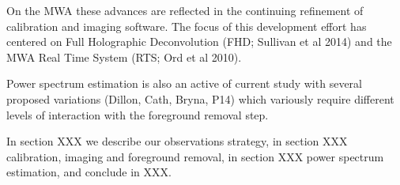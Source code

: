 On the MWA these advances are reflected in the continuing refinement of calibration and imaging software. The focus of this development effort has centered on Full Holographic Deconvolution (FHD; Sullivan et al 2014) and the MWA Real Time System (RTS; Ord et al 2010).  


Power spectrum estimation is also an active of current study with several proposed variations (Dillon, Cath, Bryna, P14) which variously require different levels of interaction with the foreground removal step.




In section XXX we describe our observations strategy, in section XXX calibration, imaging and foreground removal, in section XXX power spectrum estimation, and conclude in XXX.